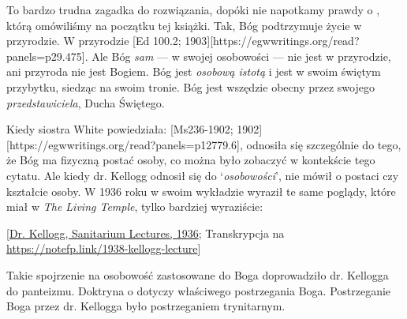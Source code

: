 To bardzo trudna zagadka do rozwiązania, dopóki nie napotkamy prawdy o , którą omówiliśmy na początku tej książki. Tak, Bóg podtrzymuje życie w przyrodzie. W przyrodzie [Ed 100.2; 1903][https://egwwritings.org/read?panels=p29.475]. Ale Bóg \textit{sam} — w swojej osobowości — nie jest w przyrodzie, ani przyroda nie jest Bogiem. Bóg jest \textit{osobową istotą} i jest w swoim świętym przybytku, siedząc na swoim tronie. Bóg jest wszędzie obecny przez swojego \textit{przedstawiciela}, Ducha Świętego.

Kiedy siostra White powiedziała: [Ms236-1902; 1902][https://egwwritings.org/read?panels=p12779.6], odnosiła się szczególnie do tego, że Bóg ma fizyczną postać osoby, co można było zobaczyć w kontekście tego cytatu. Ale kiedy dr. Kellogg odnosił się do ‘\textit{osobowości}’, nie mówił o postaci czy kształcie osoby. W 1936 roku w swoim wykładzie wyraził te same poglądy, które miał w \textit{The Living Temple}, tylko bardziej wyraziście:


[\href{https://forgotten-pillar.s3.us-east-2.amazonaws.com/Sanitarium+Lecture+1936.pdf}{Dr. Kellogg, Sanitarium Lectures, 1936}; Transkrypcja na \href{https://notefp.link/1938-kellogg-lecture}{https://notefp.link/1938-kellogg-lecture}]

Takie spojrzenie na osobowość zastosowane do Boga doprowadziło dr. Kellogga do panteizmu. Doktryna o  dotyczy właściwego postrzegania Boga. Postrzeganie Boga przez dr. Kellogga było postrzeganiem trynitarnym.

